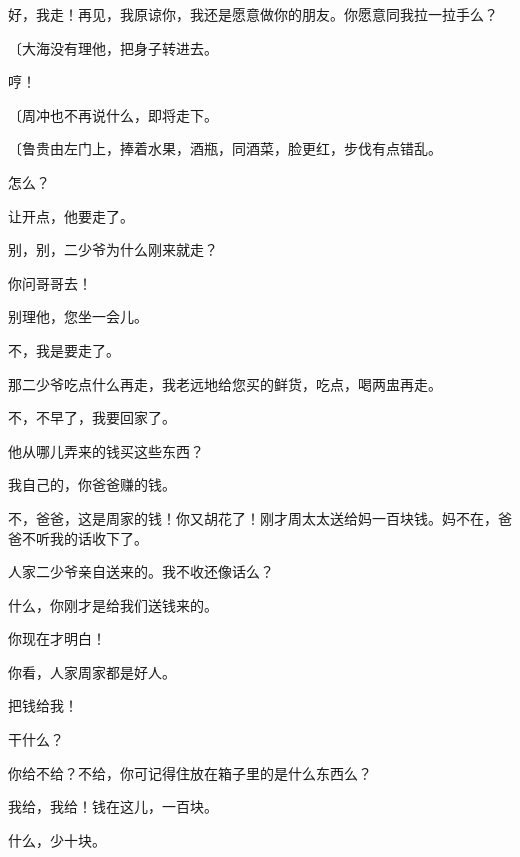 好，我走！再见，我原谅你，我还是愿意做你的朋友。你愿意同我拉一拉手么？

{\fangsong〔大海没有理他，把身子转进去。}

哼！

{\fangsong〔周冲也不再说什么，即将走下。}

{\fangsong〔鲁贵由左门上，捧着水果，酒瓶，同酒菜，脸更红，步伐有点错乱。}

怎么？

让开点，他要走了。

别，别，二少爷为什么刚来就走？

你问哥哥去！

别理他，您坐一会儿。

不，我是要走了。

那二少爷吃点什么再走，我老远地给您买的鲜货，吃点，喝两盅再走。

不，不早了，我要回家了。

他从哪儿弄来的钱买这些东西？

我自己的，你爸爸赚的钱。

不，爸爸，这是周家的钱！你又胡花了！刚才周太太送给妈一百块钱。妈不在，爸爸不听我的话收下了。

人家二少爷亲自送来的。我不收还像话么？

什么，你刚才是给我们送钱来的。

你现在才明白！

你看，人家周家都是好人。

把钱给我！

干什么？

你给不给？不给，你可记得住放在箱子里的是什么东西么？

我给，我给！钱在这儿，一百块。

什么，少十块。

